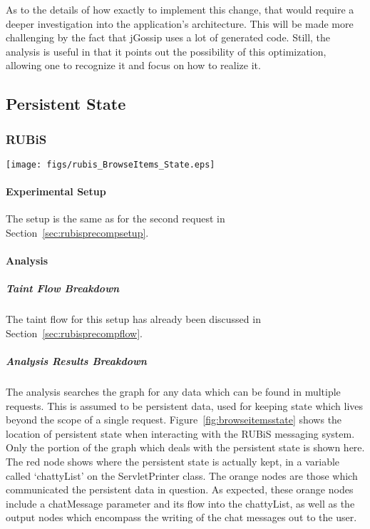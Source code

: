 \documentclass[msc,oneside]{ubcthesis}
\begin{document}
As to the details of how exactly to implement this change, that would require a deeper investigation into the application's architecture. This will be made more challenging by the fact that jGossip uses a lot of generated code. Still, the analysis is useful in that it points out the possibility of this optimization, allowing one to recognize it and focus on how to realize it.

\subsection{Persistent State}
\label{ana:pers}
\subsubsection{RUBiS}

\begin{sidewaysfigure}
\centering
\scalebox{0.5}
{\texttt{[image: figs/rubis\_BrowseItems\_State.eps]}}
\caption{RUBiS Browse Items State Analysis Results} 
\label{fig:browseitemsstate}
\end{sidewaysfigure}

\paragraph{Experimental Setup}
The setup is the same as for the second request in Section~\ref{sec:rubisprecompsetup}.

\paragraph{Analysis}
\subparagraph{Taint Flow Breakdown}
The taint flow for this setup has already been discussed in Section~\ref{sec:rubisprecompflow}.

\subparagraph{Analysis Results Breakdown}
The analysis searches the graph for any data which can be found in multiple requests. This is assumed to be persistent data, used for keeping state which lives beyond the scope of a single request. Figure~\ref{fig:browseitemsstate} shows the location of persistent state when interacting with the RUBiS messaging system. Only the portion of the graph which deals with the persistent state is shown here. The red node shows where the persistent state is actually kept, in a variable called `chattyList' on the ServletPrinter class. The orange nodes are those which communicated the persistent data in question. As expected, these  orange nodes include a chatMessage parameter and its flow into the chattyList, as well as the output nodes which encompass the writing of the chat messages out to the user.\\
\end{document}
